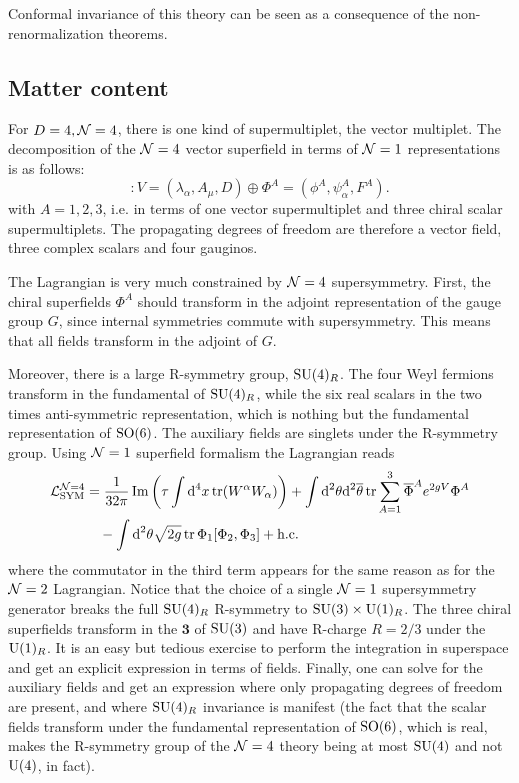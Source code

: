 \documentclass[a4paper,10pt]{article}
\begin{document}
        Conformal invariance of this theory can be seen as a consequence of the non-renormalization theorems.

    \subsection{Matter content}
        
        For $D=4,\mathcal{N}=4$, there is one kind of supermultiplet, the vector multiplet. The decomposition of the $\mathcal{N} = 4$ vector superfield in terms of $\mathcal{N} = 1$ representations is as follows:
        \begin{equation}
            [\mN = 4 \text{ vector multiplet}] : V = (\lambda_\alpha, A_\mu, D) \oplus \Phi^A = (\phi^A,\psi^A_\alpha,F^A).
        \end{equation}
        with $A=1,2,3$, i.e. in terms of one vector supermultiplet and three chiral scalar supermultiplets. The propagating degrees of freedom are therefore a vector field, three complex scalars and four gauginos.
        
        The Lagrangian is very much constrained by $\mathcal{N} = 4$ supersymmetry. First, the chiral superfields $\Phi^A$ should transform in the adjoint representation of the gauge group $G$, since internal symmetries commute with supersymmetry. This means that all fields transform in the adjoint of $G$.
        
        Moreover, there is a large R-symmetry group, $\text{SU}(4)_R$. The four Weyl fermions transform in the fundamental of $\text{SU}(4)_R$, while the six real scalars in the two times anti-symmetric representation, which is nothing but the fundamental representation of $\text{SO}(6)$. The auxiliary fields are singlets under the R-symmetry group. Using $\mathcal{N} = 1$ superfield formalism the Lagrangian reads
        \begin{align}
            \begin{split}
                \mathcal{L}^{\mathcal{N}=4}_{\text{SYM}} &= \frac{1}{32\pi}\Im \left(\tau\int\text{d}^4x\tr(W^\alpha W_\alpha)\right)+\int\text{d}^2\theta\text{d}^2\overline{\theta}\tr\sum^3_{A=1}\overline{\Phi}^Ae^{2gV}\Phi^A\\
                &\quad-\int\text{d}^2\theta\sqrt{2g}\tr\Phi_1[\Phi_2,\Phi_3]+\text{h.c.}
            \end{split}\label{eq:N4lag}
        \end{align}
        where the commutator in the third term appears for the same reason as for the $\mathcal{N} = 2$ Lagrangian. Notice that the choice of a single $\mathcal{N} = 1$ supersymmetry generator breaks the full $\text{SU}(4)_R$ R-symmetry to $\text{SU}(3)\times \text{U}(1)_R$. The three chiral superfields transform in the $\boldsymbol{3}$ of $\text{SU}(3)$ and have R-charge $R = 2/3$ under the $\text{U}(1)_R$. It is an easy but tedious exercise to perform the integration in superspace and get an explicit expression in terms of fields. Finally, one can solve for the auxiliary fields and get an expression where only propagating degrees of freedom are present, and where $\text{SU}(4)_R$ invariance is manifest (the fact that the scalar fields transform under the fundamental representation of $\text{SO}(6)$, which is real, makes the R-symmetry group of the $\mathcal{N} = 4$ theory being at most $\text{SU}(4)$ and not $\text{U}(4)$, in fact).
\end{document}
